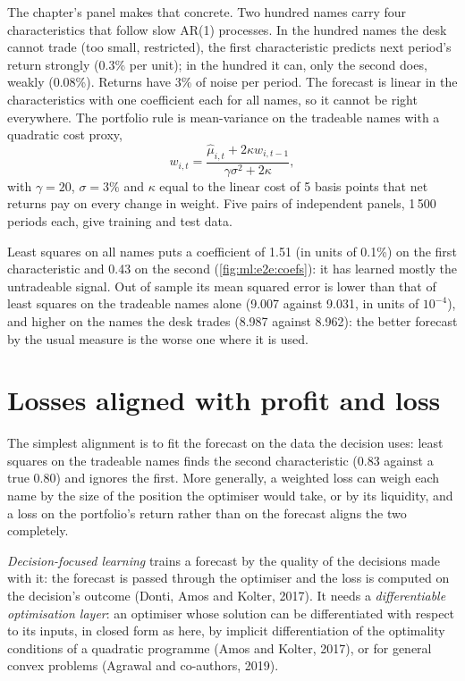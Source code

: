The chapter's panel makes that concrete. Two hundred names carry four characteristics that follow slow AR(1) processes. In
the hundred names the desk cannot trade (too small, restricted), the first characteristic predicts next period's return
strongly (0.3\% per unit); in the hundred it can, only the second does, weakly (0.08\%). Returns have 3\% of noise per period.
The forecast is linear in the characteristics with one coefficient each for all names, so it cannot be right everywhere. The
portfolio rule is mean-variance on the tradeable names with a quadratic cost proxy,
\[
w_{i,t} = \frac{\hat\mu_{i,t} + 2\kappa w_{i,t-1}}{\gamma\sigma^2 + 2\kappa},
\]
with $\gamma = 20$, $\sigma = 3\%$ and $\kappa$ equal to the linear cost of 5 basis points that net returns pay on every
change in weight. Five pairs of independent panels, 1\,500 periods each, give training and test data.

Least squares on all names puts a coefficient of 1.51 (in units of 0.1\%) on the first characteristic and 0.43 on the second
(\cref{fig:ml:e2e:coefs}): it has learned mostly the untradeable signal. Out of sample its mean squared error is lower than
that of least squares on the tradeable names alone (9.007 against 9.031, in units of $10^{-4}$), and higher on the names the
desk trades (8.987 against 8.962): the better forecast by the usual measure is the worse one where it is used.

\section{Losses aligned with profit and loss}

The simplest alignment is to fit the forecast on the data the decision uses: least squares on the tradeable names finds the
second characteristic (0.83 against a true 0.80) and ignores the first. More generally, a weighted loss can weigh each name by
the size of the position the optimiser would take, or by its liquidity, and a loss on the portfolio's return rather than on the
forecast aligns the two completely.

\begin{definition}\label{def:ml:from-prediction-to-portfolio:dfl}
\emph{Decision-focused learning} trains a forecast by the quality of the decisions made with
it: the forecast is passed through the optimiser and the loss is computed on the decision's outcome (Donti, Amos and Kolter,
2017). It needs a \emph{differentiable optimisation layer}: an optimiser whose solution
can be differentiated with respect to its inputs, in closed form as here, by implicit differentiation of the optimality
conditions of a quadratic programme (Amos and Kolter, 2017), or for general convex problems (Agrawal and co-authors, 2019).
\end{definition}

